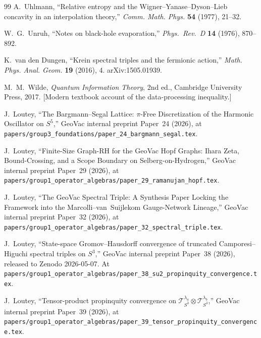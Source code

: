 \documentclass[11pt,a4paper]{article}
\theoremstyle{plain}
\theoremstyle{definition}
\newcommand{\Tcal}{\mathcal{T}}
\begin{document}
\begin{thebibliography}{99}
A.~Uhlmann, ``Relative entropy and the Wigner--Yanase--Dyson--Lieb
concavity in an interpolation theory,''
\emph{Comm. Math. Phys.} \textbf{54} (1977), 21--32.

W.~G.~Unruh, ``Notes on black-hole evaporation,'' \emph{Phys.~Rev.~D}
\textbf{14} (1976), 870--892.

K.~van den Dungen, ``Krein spectral triples and the fermionic action,''
\emph{Math. Phys. Anal. Geom.} \textbf{19} (2016), 4. arXiv:1505.01939.

M.~M.~Wilde, \emph{Quantum Information Theory}, 2nd ed., Cambridge
University Press, 2017.
[Modern textbook account of the data-processing inequality.]


J.~Loutey, ``The Bargmann--Segal Lattice: $\pi$-Free Discretization
of the Harmonic Oscillator on $S^5$,'' GeoVac internal preprint
Paper~24 (2026), at
\texttt{papers/group3\_foundations/paper\_24\_bargmann\_segal.tex}.

J.~Loutey, ``Finite-Size Graph-RH for the GeoVac Hopf Graphs: Ihara Zeta, Bound-Crossing, and a Scope Boundary on Selberg-on-Hydrogen,'' GeoVac internal preprint
Paper~29 (2026), at
\texttt{papers/group1\_operator\_algebras/paper\_29\_ramanujan\_hopf.tex}.

J.~Loutey, ``The GeoVac Spectral Triple: A Synthesis Paper Locking the
Framework into the Marcolli--van~Suijlekom Gauge-Network Lineage,'' GeoVac internal preprint
Paper~32 (2026), at
\texttt{papers/group1\_operator\_algebras/paper\_32\_spectral\_triple.tex}.

J.~Loutey, ``State-space Gromov--Hausdorff convergence of truncated
Camporesi--Higuchi spectral triples on $S^3$,'' GeoVac internal preprint Paper~38 (2026), released
to Zenodo 2026-05-07. At
\texttt{papers/group1\_operator\_algebras/paper\_38\_su2\_propinquity\_convergence.tex}.

J.~Loutey, ``Tensor-product propinquity convergence on
$\Tcal_{S^{3}}^{\lambda_{a}}\otimes\Tcal_{S^{3}}^{\lambda_{b}}$,''
GeoVac internal preprint Paper~39 (2026), at
\texttt{papers/group1\_operator\_algebras/paper\_39\_tensor\_propinquity\_convergence.tex}.


\end{thebibliography}
\end{document}
